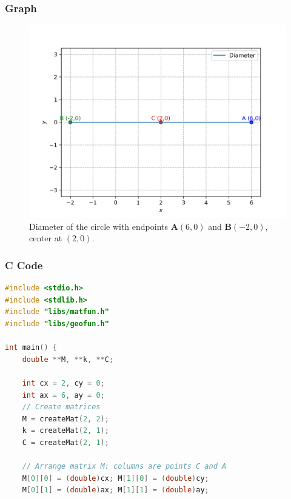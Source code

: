 \documentclass{beamer}
\theoremstyle{remark}
\numberwithin{equation}{section}
\numberwithin{equation}{section}
\begin{document}
\begin{frame}
    \frametitle{Graph}
    \begin{figure}[h!]
        \centering
        \includegraphics[width=0.7\linewidth]{FIG/graph.png}
        \caption{Diameter of the circle with endpoints $\mathbf{A}(6,0)$ and $\mathbf{B}(-2,0)$, center at $(2,0)$.}
    \end{figure}
\end{frame}
\begin{frame}[fragile]
\frametitle{C Code }
\begin{lstlisting}[language=C]
#include <stdio.h>
#include <stdlib.h>
#include "libs/matfun.h"
#include "libs/geofun.h"

int main() {
    double **M, **k, **C;

    int cx = 2, cy = 0;
    int ax = 6, ay = 0;
    // Create matrices
    M = createMat(2, 2);
    k = createMat(2, 1);
    C = createMat(2, 1);

    // Arrange matrix M: columns are points C and A
    M[0][0] = (double)cx; M[1][0] = (double)cy;
    M[0][1] = (double)ax; M[1][1] = (double)ay;

\end{lstlisting}
\end{frame}
\end{document}
